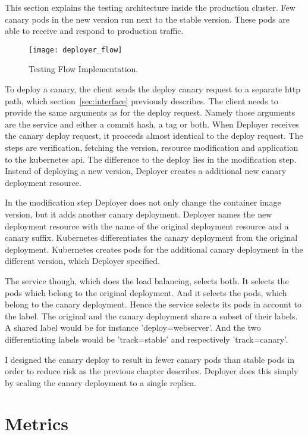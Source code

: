 This section explains the testing architecture inside the production cluster. Few canary
pods in the new version run next to the stable version. These pods are able to receive and
respond to production traffic.

\begin{figure}[htbp] \centering \texttt{[image: deployer\_flow]}
  \caption[nprtflow]{Testing Flow Implementation.}
  \label{fig:testing_flow}
\end{figure}


To deploy a canary, the client sends the deploy canary request to a separate http path,
which section~\ref{sec:interface} previously describes. The client needs to provide the
same arguments as for the deploy request. Namely those arguments are the service and
either a commit hash, a tag or both. When Deployer receives the canary deploy request, it
proceeds almost identical to the deploy request. The steps are verification, fetching the
version, resource modification and application to the kubernetes api. The difference to
the deploy lies in the modification step. Instead of deploying a new version, Deployer
creates a additional new canary deployment resource.

In the modification step Deployer does not only change the container image version, but it
adds another canary deployment. Deployer names the new deployment resource with the name
of the original deployment resource and a canary suffix. Kubernetes differentiates the
canary deployment from the original deployment. Kubernetes creates pods for the additional
canary deployment in the different version, which Deployer specified.

The service though, which does the load balancing, selects both. It selects the pods which
belong to the original deployment. And it selects the pods, which belong to the canary
deployment. Hence the service selects its pods in account to the label. The original and
the canary deployment share a subset of their labels. A shared label would be for instance
'deploy=webserver'. And the two differentiating labels would be 'track=stable' and
respectively 'track=canary'.

I designed the canary deploy to result in fewer canary pods than stable pods in order to
reduce risk as the previous chapter describes. Deployer does this simply by scaling the
canary deployment to a single replica.

\section{Metrics}


